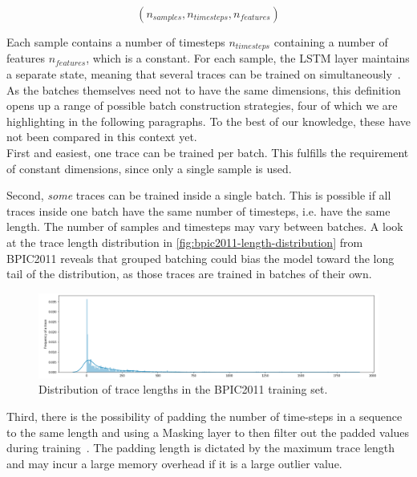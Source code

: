 $$(n_{samples}, n_{timesteps}, n_{features})$$

Each sample contains a number of timesteps $n_{timesteps}$ containing a number of features $n_{features}$, which is a constant. For each sample, the LSTM layer maintains a separate state, meaning that several traces can be trained on simultaneously~\cite{web:keras-lstm-state}. As the batches themselves need not to have the same dimensions, this definition opens up a range of possible batch construction strategies, four of which we are highlighting in the following paragraphs. To the best of our knowledge, these have not been compared in this context yet.\\

First and easiest, one trace can be trained per batch. This fulfills the requirement of constant dimensions, since only a single sample is used.

Second, \textit{some} traces can be trained inside a single batch. This is possible if all traces inside one batch have the same number of timesteps, i.e. have the same length. The number of samples and timesteps may vary between batches. A look at the trace length distribution in \autoref{fig:bpic2011-length-distribution} from BPIC2011 reveals that grouped batching could bias the model toward the long tail of the distribution, as those traces are trained in batches of their own.

\begin{figure}[ht!]
    \centering
    \includegraphics[width=.9\textwidth]{gfx/frequency-distribution.png}
    \caption{Distribution of trace lengths in the BPIC2011 training set.}
    \label{fig:bpic2011-length-distribution}
\end{figure}

Third, there is the possibility of padding the number of time-steps in a sequence to the same length and using a Masking layer to then filter out the padded values during training~\cite{web:keras}. The padding length is dictated by the maximum trace length and may incur a large memory overhead if it is a large outlier value.

